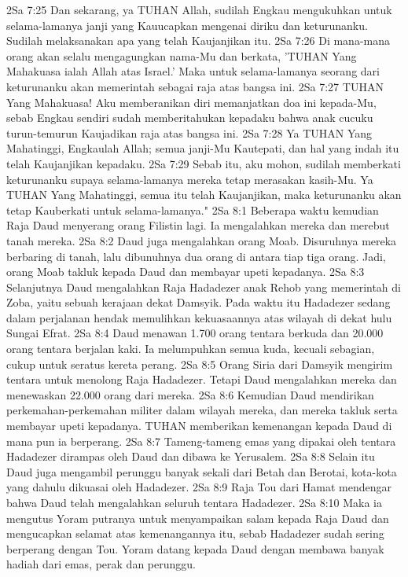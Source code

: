 2Sa 7:25  Dan sekarang, ya TUHAN Allah, sudilah Engkau mengukuhkan untuk selama-lamanya janji yang Kauucapkan mengenai diriku dan keturunanku. Sudilah melaksanakan apa yang telah Kaujanjikan itu.
2Sa 7:26  Di mana-mana orang akan selalu mengagungkan nama-Mu dan berkata, 'TUHAN Yang Mahakuasa ialah Allah atas Israel.' Maka untuk selama-lamanya seorang dari keturunanku akan memerintah sebagai raja atas bangsa ini.
2Sa 7:27  TUHAN Yang Mahakuasa! Aku memberanikan diri memanjatkan doa ini kepada-Mu, sebab Engkau sendiri sudah memberitahukan kepadaku bahwa anak cucuku turun-temurun Kaujadikan raja atas bangsa ini.
2Sa 7:28  Ya TUHAN Yang Mahatinggi, Engkaulah Allah; semua janji-Mu Kautepati, dan hal yang indah itu telah Kaujanjikan kepadaku.
2Sa 7:29  Sebab itu, aku mohon, sudilah memberkati keturunanku supaya selama-lamanya mereka tetap merasakan kasih-Mu. Ya TUHAN Yang Mahatinggi, semua itu telah Kaujanjikan, maka keturunanku akan tetap Kauberkati untuk selama-lamanya."
2Sa 8:1  Beberapa waktu kemudian Raja Daud menyerang orang Filistin lagi. Ia mengalahkan mereka dan merebut tanah mereka.
2Sa 8:2  Daud juga mengalahkan orang Moab. Disuruhnya mereka berbaring di tanah, lalu dibunuhnya dua orang di antara tiap tiga orang. Jadi, orang Moab takluk kepada Daud dan membayar upeti kepadanya.
2Sa 8:3  Selanjutnya Daud mengalahkan Raja Hadadezer anak Rehob yang memerintah di Zoba, yaitu sebuah kerajaan dekat Damsyik. Pada waktu itu Hadadezer sedang dalam perjalanan hendak memulihkan kekuasaannya atas wilayah di dekat hulu Sungai Efrat.
2Sa 8:4  Daud menawan 1.700 orang tentara berkuda dan 20.000 orang tentara berjalan kaki. Ia melumpuhkan semua kuda, kecuali sebagian, cukup untuk seratus kereta perang.
2Sa 8:5  Orang Siria dari Damsyik mengirim tentara untuk menolong Raja Hadadezer. Tetapi Daud mengalahkan mereka dan menewaskan 22.000 orang dari mereka.
2Sa 8:6  Kemudian Daud mendirikan perkemahan-perkemahan militer dalam wilayah mereka, dan mereka takluk serta membayar upeti kepadanya. TUHAN memberikan kemenangan kepada Daud di mana pun ia berperang.
2Sa 8:7  Tameng-tameng emas yang dipakai oleh tentara Hadadezer dirampas oleh Daud dan dibawa ke Yerusalem.
2Sa 8:8  Selain itu Daud juga mengambil perunggu banyak sekali dari Betah dan Berotai, kota-kota yang dahulu dikuasai oleh Hadadezer.
2Sa 8:9  Raja Tou dari Hamat mendengar bahwa Daud telah mengalahkan seluruh tentara Hadadezer.
2Sa 8:10  Maka ia mengutus Yoram putranya untuk menyampaikan salam kepada Raja Daud dan mengucapkan selamat atas kemenangannya itu, sebab Hadadezer sudah sering berperang dengan Tou. Yoram datang kepada Daud dengan membawa banyak hadiah dari emas, perak dan perunggu.
